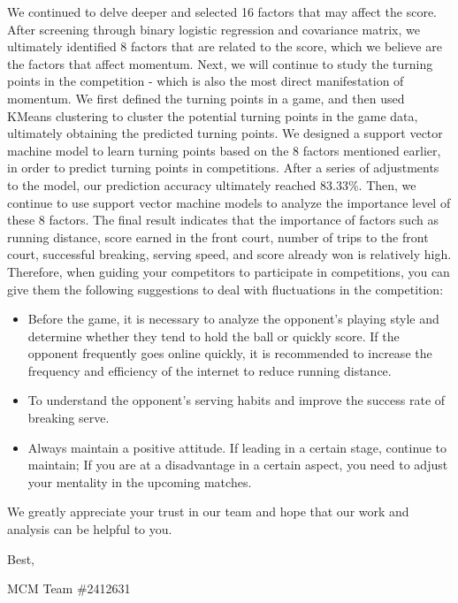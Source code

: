 \documentclass{mcmthesis}
\begin{document}
We continued to delve deeper and selected 16 factors that may affect the score. After screening through binary logistic regression and covariance matrix, we ultimately identified 8 factors that are related to the score, which we believe are the factors that affect momentum. Next, we will continue to study the turning points in the competition - which is also the most direct manifestation of momentum. We first defined the turning points in a game, and then used KMeans clustering to cluster the potential turning points in the game data, ultimately obtaining the predicted turning points. We designed a support vector machine model to learn turning points based on the 8 factors mentioned earlier, in order to predict turning points in competitions. After a series of adjustments to the model, our prediction accuracy ultimately reached 83.33\%. Then, we continue to use support vector machine models to analyze the importance level of these 8 factors. The final result indicates that the importance of factors such as running distance, score earned in the front court, number of trips to the front court, successful breaking, serving speed, and score already won is relatively high. Therefore, when guiding your competitors to participate in competitions, you can give them the following suggestions to deal with fluctuations in the competition:
\begin{itemize}
  \item Before the game, it is necessary to analyze the opponent's playing style and determine whether they tend to hold the ball or quickly score. If the opponent frequently goes online quickly, it is recommended to increase the frequency and efficiency of the internet to reduce running distance.
  \item To understand the opponent's serving habits and improve the success rate of breaking serve.
  \item Always maintain a positive attitude. If leading in a certain stage, continue to maintain; If you are at a disadvantage in a certain aspect, you need to adjust your mentality in the upcoming matches.
\end{itemize}

We greatly appreciate your trust in our team and hope that our work and analysis can be helpful to you.

\begin{letter}{}

Best,

\end{letter}
MCM Team \#2412631
\end{document}
